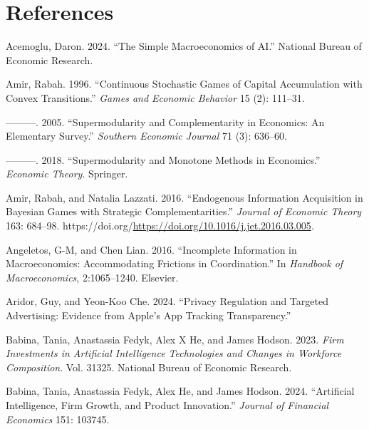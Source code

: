 \documentclass[
]{article}
\newlength{\cslhangindent}
\newenvironment{CSLReferences}[2] %
 {\begin{list}{}{%
  \setlength{\itemindent}{0pt}
  \setlength{\leftmargin}{0pt}
  \setlength{\parsep}{0pt}
  \ifodd #1
   \setlength{\leftmargin}{\cslhangindent}
   \setlength{\itemindent}{-1\cslhangindent}
  \fi
  \setlength{\itemsep}{#2\baselineskip}}}
 {\end{list}}
\theoremstyle{definition}
\theoremstyle{plain}
\theoremstyle{remark}
\begin{document}
\section{References}\label{references}

\label{refs}
\begin{CSLReferences}{1}{0}
Acemoglu, Daron. 2024. {``The Simple Macroeconomics of AI.''} National
Bureau of Economic Research.

Amir, Rabah. 1996. {``Continuous Stochastic Games of Capital
Accumulation with Convex Transitions.''} \emph{Games and Economic
Behavior} 15 (2): 111--31.

---------. 2005. {``Supermodularity and Complementarity in Economics: An
Elementary Survey.''} \emph{Southern Economic Journal} 71 (3): 636--60.

---------. 2018. {``Supermodularity and Monotone Methods in
Economics.''} \emph{Economic Theory}. Springer.

Amir, Rabah, and Natalia Lazzati. 2016. {``Endogenous Information
Acquisition in Bayesian Games with Strategic Complementarities.''}
\emph{Journal of Economic Theory} 163: 684--98.
https://doi.org/\url{https://doi.org/10.1016/j.jet.2016.03.005}.

Angeletos, G-M, and Chen Lian. 2016. {``Incomplete Information in
Macroeconomics: Accommodating Frictions in Coordination.''} In
\emph{Handbook of Macroeconomics}, 2:1065--1240. Elsevier.

Aridor, Guy, and Yeon-Koo Che. 2024. {``Privacy Regulation and Targeted
Advertising: Evidence from Apple's App Tracking Transparency.''}

Babina, Tania, Anastassia Fedyk, Alex X He, and James Hodson. 2023.
\emph{Firm Investments in Artificial Intelligence Technologies and
Changes in Workforce Composition}. Vol. 31325. National Bureau of
Economic Research.

Babina, Tania, Anastassia Fedyk, Alex He, and James Hodson. 2024.
{``Artificial Intelligence, Firm Growth, and Product Innovation.''}
\emph{Journal of Financial Economics} 151: 103745.


\end{CSLReferences}
\end{document}

